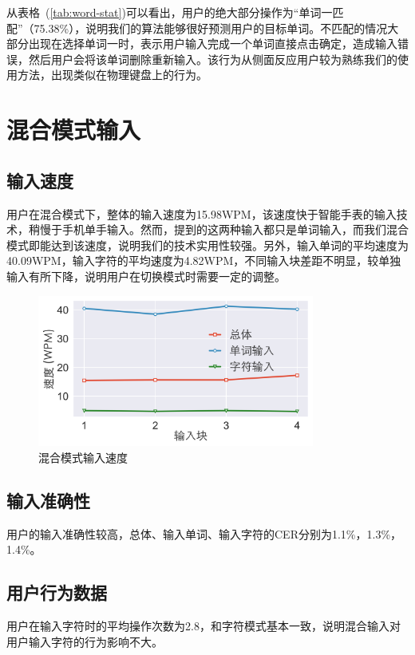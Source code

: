 从表格~(\ref{tab:word-stat})可以看出，用户的绝大部分操作为“单词一匹配”（75.38\%），说明我们的算法能够很好预测用户的目标单词。不匹配的情况大部分出现在选择单词一时，表示用户输入完成一个单词直接点击确定，造成输入错误，然后用户会将该单词删除重新输入。该行为从侧面反应用户较为熟练我们的使用方法，出现类似在物理键盘上的行为。


\section{混合模式输入} %

\subsection{输入速度}
用户在混合模式下，整体的输入速度为15.98WPM，该速度快于智能手表的输入技术\cite{compass}，稍慢于手机单手输入\cite{2017blindtype}。然而，提到的这两种输入都只是单词输入，而我们混合模式即能达到该速度，说明我们的技术实用性较强。另外，输入单词的平均速度为40.09WPM，输入字符的平均速度为4.82WPM，不同输入块差距不明显，较单独输入有所下降，说明用户在切换模式时需要一定的调整。

\begin{figure}[h] %
    \centering
    \includegraphics[height=5cm]{figures/wholespeed.png}
    \caption{混合模式输入速度}
    \label{fig:wholespeed}
\end{figure}


\subsection{输入准确性}
用户的输入准确性较高，总体、输入单词、输入字符的CER分别为1.1\%，1.3\%，1.4\%。

\subsection{用户行为数据}
用户在输入字符时的平均操作次数为2.8，和字符模式基本一致，说明混合输入对用户输入字符的行为影响不大。

